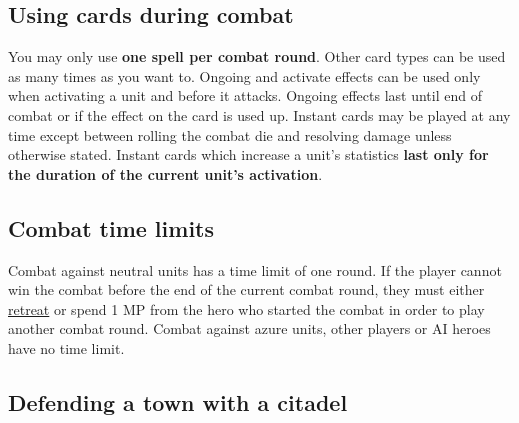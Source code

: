 \documentclass[12pt]{article}
\def\assets{assets}
\def\svgs{\assets/svgs}
\begin{document}
\subsection*{\hypertarget{CombatCards}{Using cards during combat}}
You may only use \textbf{one spell per combat round}. Other card types can be used as many times as you want to. Ongoing  and  activate effects can be used only when activating a unit and before it attacks. Ongoing effects last until end of combat or if the effect on the card is used up. Instant  cards may be played at any time except between rolling the combat die and resolving damage unless otherwise stated. Instant cards which increase a unit's statistics \textbf{last only for the duration of the current unit's activation}.
\subsection*{\hypertarget{Timelimit}{Combat time limits}}
Combat against neutral units has a time limit of one round. If the player cannot win the combat
before the end of the current combat round, they must either \hyperlink{Endcombat}{retreat} or spend 1 MP from the hero who started the combat in order to play another combat round. Combat against azure units, other players or AI heroes have no time limit.
\clearpage
\subsection*{\hypertarget{Walls}{Defending a town with a citadel}}
\end{document}
